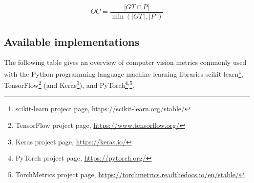 \documentclass{article}
\begin{document}
\begin{equation}
    \textit{OC} = \dfrac{|\textit{GT} \cap P|}{\min(|\textit{GT}\,|, |P|)}
%
    \label{equation:OC}
\end{equation}




\clearpage




\subsection{Available implementations}

The following table gives an overview of computer vision metrics commonly used with the Python programming language machine learning libraries scikit-learn\footnote{scikit-learn project page, \url{https://scikit-learn.org/stable/}}, TensorFlow\footnote{TensorFlow project page, \url{https://www.tensorflow.org/}} (and Keras\footnote{Keras project page, \url{https://keras.io/}}), and PyTorch\footnote{PyTorch project page, \url{https://pytorch.org/}}\textsuperscript{,}\footnote{TorchMetrics project page, \url{https://torchmetrics.readthedocs.io/en/stable/}}.
\end{document}
